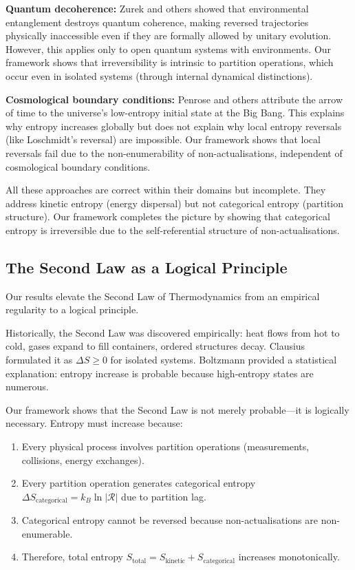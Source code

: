 \documentclass[twocolumn,10pt]{article}
\theoremstyle{definition}
\theoremstyle{remark}
\begin{document}
\textbf{Quantum decoherence:} Zurek and others showed that environmental entanglement destroys quantum coherence, making reversed trajectories physically inaccessible even if they are formally allowed by unitary evolution. However, this applies only to open quantum systems with environments. Our framework shows that irreversibility is intrinsic to partition operations, which occur even in isolated systems (through internal dynamical distinctions).

\textbf{Cosmological boundary conditions:} Penrose and others attribute the arrow of time to the universe's low-entropy initial state at the Big Bang. This explains why entropy increases globally but does not explain why local entropy reversals (like Loschmidt's reversal) are impossible. Our framework shows that local reversals fail due to the non-enumerability of non-actualisations, independent of cosmological boundary conditions.

All these approaches are correct within their domains but incomplete. They address kinetic entropy (energy dispersal) but not categorical entropy (partition structure). Our framework completes the picture by showing that categorical entropy is irreversible due to the self-referential structure of non-actualisations.

\subsection{The Second Law as a Logical Principle}

Our results elevate the Second Law of Thermodynamics from an empirical regularity to a logical principle.

Historically, the Second Law was discovered empirically: heat flows from hot to cold, gases expand to fill containers, ordered structures decay. Clausius formulated it as $\Delta S \geq 0$ for isolated systems. Boltzmann provided a statistical explanation: entropy increase is probable because high-entropy states are numerous.

Our framework shows that the Second Law is not merely probable—it is logically necessary. Entropy must increase because:

\begin{enumerate}
\item Every physical process involves partition operations (measurements, collisions, energy exchanges).
\item Every partition operation generates categorical entropy $\Delta S_{\text{categorical}} = k_B \ln|\mathcal{R}|$ due to partition lag.
\item Categorical entropy cannot be reversed because non-actualisations are non-enumerable.
\item Therefore, total entropy $S_{\text{total}} = S_{\text{kinetic}} + S_{\text{categorical}}$ increases monotonically.
\end{enumerate}
\end{document}
